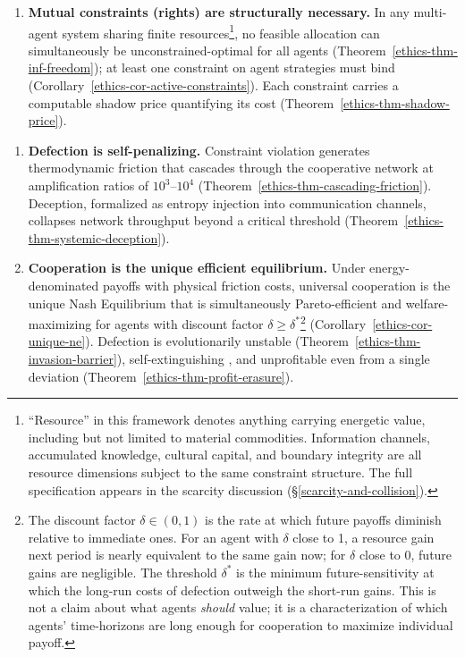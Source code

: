 \documentclass[11pt]{article}
\theoremstyle{plain}
\theoremstyle{definition}
\theoremstyle{remark}
\providecommand{\tightlist}{%
  \setlength{\itemsep}{0pt}\setlength{\parskip}{0pt}}
\begin{document}
\begin{enumerate}
\def\labelenumi{\arabic{enumi}.}
\tightlist
\item
  \textbf{Mutual constraints (rights) are structurally necessary.} In
  any multi-agent system sharing finite resources\footnote{``Resource''
    in this framework denotes anything carrying energetic value,
    including but not limited to material commodities. Information
    channels, accumulated knowledge, cultural capital, and boundary
    integrity are all resource dimensions subject to the same constraint
    structure. The full specification appears in the scarcity discussion
    (§\ref{scarcity-and-collision}).}, no feasible allocation can
  simultaneously be unconstrained-optimal for all agents
  (Theorem~\ref{ethics-thm-inf-freedom}); at least one constraint on
  agent strategies must bind
  (Corollary~\ref{ethics-cor-active-constraints}). Each constraint
  carries a computable shadow price quantifying its cost
  (Theorem~\ref{ethics-thm-shadow-price}).
\end{enumerate}

\begin{enumerate}
\def\labelenumi{\arabic{enumi}.}
\setcounter{enumi}{1}
\item
  \textbf{Defection is self-penalizing.} Constraint violation generates
  thermodynamic friction that cascades through the cooperative network
  at amplification ratios of \(10^3\)--\(10^4\)
  (Theorem~\ref{ethics-thm-cascading-friction}). Deception, formalized
  as entropy injection into communication channels, collapses network
  throughput beyond a critical threshold
  (Theorem~\ref{ethics-thm-systemic-deception}).
\item
  \textbf{Cooperation is the unique efficient equilibrium.} Under
  energy-denominated payoffs with physical friction costs, universal
  cooperation is the unique Nash Equilibrium that is simultaneously
  Pareto-efficient and welfare-maximizing for agents with discount
  factor \(\delta \geq \delta^*\)\footnote{The discount factor
    \(\delta \in (0,1)\) is the rate at which future payoffs diminish
    relative to immediate ones. For an agent with \(\delta\) close to 1,
    a resource gain next period is nearly equivalent to the same gain
    now; for \(\delta\) close to 0, future gains are negligible. The
    threshold \(\delta^*\) is the minimum future-sensitivity at which
    the long-run costs of defection outweigh the short-run gains. This
    is not a claim about what agents \emph{should} value; it is a
    characterization of which agents' time-horizons are long enough for
    cooperation to maximize individual payoff.}
  (Corollary~\ref{ethics-cor-unique-ne}). Defection is evolutionarily
  unstable (Theorem~\ref{ethics-thm-invasion-barrier}),
  self-extinguishing \citep{TC-V}, and unprofitable even from a single
  deviation (Theorem~\ref{ethics-thm-profit-erasure}).
\end{enumerate}
\end{document}
